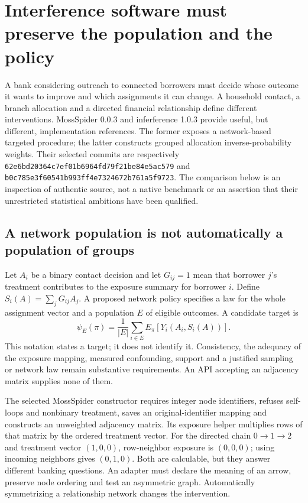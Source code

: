 \section{Interference software must preserve the population and the policy}
\label{sec:exec24-interference-reuse}

A bank considering outreach to connected borrowers must decide whose outcome it
wants to improve and which assignments it can change. A household contact, a
branch allocation and a directed financial relationship define different
interventions. MossSpider 0.0.3 and inferference 1.0.3 provide useful, but
different, implementation references. The former exposes a network-based
targeted procedure; the latter constructs grouped allocation inverse-probability
weights. Their selected commits are respectively
\texttt{62e6bd20364c7ef01b6964fd79f21be84e5ac579} and
\texttt{b0c785e3f60541b993ff4e7324672b761a5f9723}. The comparison below is
an inspection of authentic source, not a native benchmark or an assertion that
their unrestricted statistical ambitions have been qualified.
\citep{exec24_interference_mossspider,exec24_interference_inferference}

\subsection{A network population is not automatically a population of groups}
Let $A_i$ be a binary contact decision and let $G_{ij}=1$ mean that borrower
$j$'s treatment contributes to the exposure summary for borrower $i$. Define
$S_i(A)=\sum_jG_{ij}A_j$. A proposed network policy specifies a law for the
whole assignment vector and a population $E$ of eligible outcomes. A candidate
target is
\[
 \psi_E(\pi)=\frac{1}{|E|}\sum_{i\in E}E_\pi[Y_i(A_i,S_i(A))].
\]
This notation states a target; it does not identify it. Consistency, the
adequacy of the exposure mapping, measured confounding, support and a justified
sampling or network law remain substantive requirements. An API accepting an
adjacency matrix supplies none of them.

The selected MossSpider constructor requires integer node identifiers, refuses
self-loops and nonbinary treatment, saves an original-identifier mapping and
constructs an unweighted adjacency matrix. Its exposure helper multiplies rows
of that matrix by the ordered treatment vector. For the directed chain
$0\to1\to2$ and treatment vector $(1,0,0)$, row-neighbor exposure is
$(0,0,0)$; using incoming neighbors gives $(0,1,0)$. Both are calculable, but
they answer different banking questions. An adapter must declare the meaning
of an arrow, preserve node ordering and test an asymmetric graph. Automatically
symmetrizing a relationship network changes the intervention.
\citep{exec24_interference_mossspider,exec24_interference_reference}

